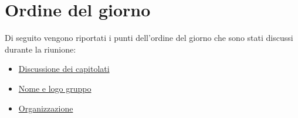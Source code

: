 \clearpage
\section{Ordine del giorno}
Di seguito vengono riportati i punti dell’ordine del giorno che sono stati discussi durante la riunione:
\begin{itemize}
	\item \hyperref[sec:discussione]{Discussione dei capitolati}
	\item \hyperref[sec:nome_logo]{Nome e logo gruppo}
	\item \hyperref[sec:organizzazione]{Organizzazione}
\end{itemize}
